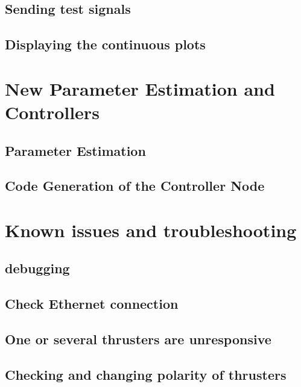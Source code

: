 \subsection{Sending test signals}


\subsection{Displaying the continuous plots}


\section{New Parameter Estimation and Controllers}
\subsection{Parameter Estimation}


\subsection{Code Generation of the Controller Node}


\section{Known issues and troubleshooting}

\subsection{\abbrROS debugging}

\subsection{Check Ethernet connection}

\subsection{One or several thrusters are unresponsive}

\subsection{Checking and changing polarity of thrusters}
